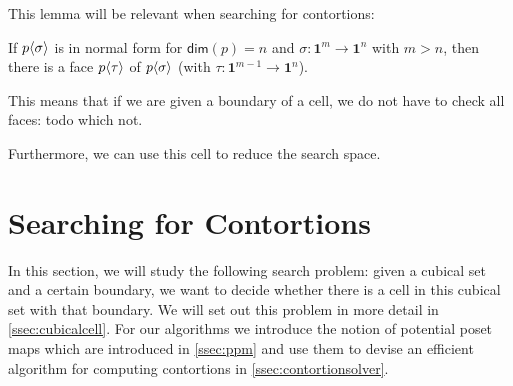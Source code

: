 \documentclass{llncs}
\newcommand{\todo}[1]{
  \begin{tcolorbox}
    TODO {#1} 
  \end{tcolorbox}
}
\newcommand{\pint}[1]{\mathbf{1}^{#1}}
\renewcommand{\dim}[1]{\mathsf{dim}({#1})}
\newcommand{\cont}[2]{\ensuremath{ \ifthenelse{\equal{#2}{}}{#1}{{#1}\langle{#2}\rangle}} }
\newcommand{\comp}[2]{\mathsf{Comp}({#1}\ {#2})}
\begin{document}
This lemma will be relevant when searching for contortions:

\begin{proposition}
  If $\cont{p}{\sigma}$ is in normal form for $\dim{p} = n$ and $\sigma :
  \pint{m} \to \pint{n}$ with $m > n$, then there is a face $\cont{p}{\tau}$ of
  $\cont{p}{\sigma}$ (with $\tau : \pint{m-1} \to \pint{n}$).


This means that if we are given a boundary of a cell, we do not have to check
all faces: todo which not.

Furthermore, we can use this cell to reduce the search space.






\section{Searching for Contortions}
\label{sec:contortionsolver}

In this section, we will study the following search problem: given a cubical set
and a certain boundary, we want to decide whether there is a cell in this
cubical set with that boundary. We will set out this problem in more detail in
\autoref{ssec:cubicalcell}. For our algorithms we introduce the notion of
potential poset maps which are introduced in \autoref{ssec:ppm} and use them to
devise an efficient algorithm for computing contortions in
\autoref{ssec:contortionsolver}. 



\end{proposition}
\end{document}
